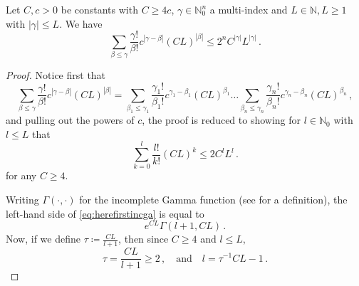 \documentclass[
	fontsize=11pt, 
	twoside=false, 
	abstract=true, 
	a4paper,
]{scrartcl}
\newcommand{\abs}[1]{\left\lvert#1\right\rvert}
\newcommand{\an}{\quad\text{and}\quad}
\begin{document}
\begin{lemma}\label{lem:incomplgamma}
	Let $C,c >0$ be constants with $C \geq 4c$, $\gamma \in \mathbb{N}_0^n$ a multi-index and $L \in \mathbb{N}, L\geq 1$ with $\abs{\gamma} \leq L$. We have	
	\[
		\sum_{\beta\leq\gamma} \frac{\gamma!}{\beta!}c^{\abs{\gamma-\beta}}(CL)^{\abs{\beta}} \leq  2^{n} C^{\abs{\gamma}} L^{\abs{\gamma}}\,.
	\]
\end{lemma}
\begin{proof}
	Notice first that
	\[
		\sum_{\beta\leq\gamma} \frac{\gamma!}{\beta!}c^{\abs{\gamma-\beta}}(CL)^{\abs{\beta}} = \sum_{\beta_1 \leq \gamma_1} \frac{\gamma_1!}{\beta_1!}c^{\gamma_1-\beta_1}(CL)^{\beta_1} \dots \sum_{\beta_n \leq \gamma_n} \frac{\gamma_n!}{\beta_n!}c^{\gamma_n-\beta_n}(CL)^{\beta_n}\,,
	\]
	and pulling out the powers of $c$, the proof is reduced to showing for $l \in \mathbb{N}_0$ with $l \leq L$ that
	\begin{equation}\label{eq:herefirstincga}
		\sum_{k=0}^l \frac{l!}{k!} (CL)^k \leq 2 C^l L^{l}\,.
	\end{equation}
	for any $C\geq 4$. %

	Writing $\Gamma(\cdot,\cdot)$ for the incomplete Gamma function (see \cite[\S~11.2]{zbMATH00884971} for a definition), the left-hand side of \cref{eq:herefirstincga} is equal to
	\[
		e^{CL}\Gamma\left(l+1, CL\right)\,.
	\]
	Now, if we define $\tau \coloneqq \frac{CL}{l+1}$, then since $C \geq 4$ and $l \leq L$,
	\[
		\tau = \frac{CL}{l+1} \geq 2\,,\an l = \tau^{-1} CL -1\,.
	\]
	

\end{proof}
\end{document}
